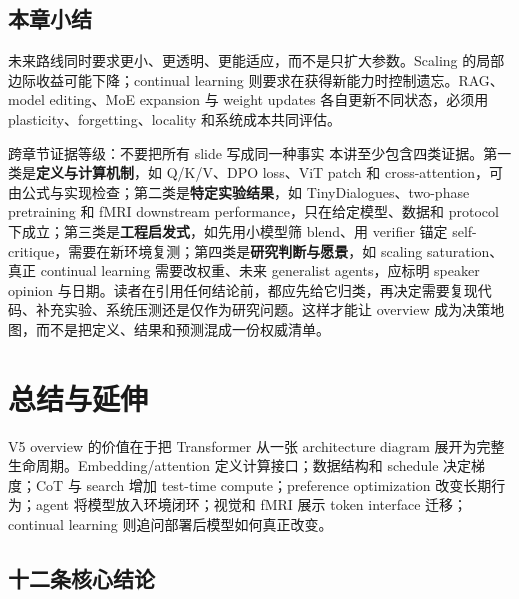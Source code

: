\documentclass[a4paper]{article}
\begin{document}
\subsection{本章小结}

未来路线同时要求更小、更透明、更能适应，而不是只扩大参数。Scaling 的局部边际收益可能下降；continual learning 则要求在获得新能力时控制遗忘。RAG、model editing、MoE expansion 与 weight updates 各自更新不同状态，必须用 plasticity、forgetting、locality 和系统成本共同评估。


\begin{importantbox}{跨章节证据等级：不要把所有 slide 写成同一种事实}
本讲至少包含四类证据。第一类是\textbf{定义与计算机制}，如 Q/K/V、DPO loss、ViT patch 和 cross-attention，可由公式与实现检查；第二类是\textbf{特定实验结果}，如 TinyDialogues、two-phase pretraining 和 fMRI downstream performance，只在给定模型、数据和 protocol 下成立；第三类是\textbf{工程启发式}，如先用小模型筛 blend、用 verifier 锚定 self-critique，需要在新环境复测；第四类是\textbf{研究判断与愿景}，如 scaling saturation、真正 continual learning 需要改权重、未来 generalist agents，应标明 speaker opinion 与日期。读者在引用任何结论前，都应先给它归类，再决定需要复现代码、补充实验、系统压测还是仅作为研究问题。这样才能让 overview 成为决策地图，而不是把定义、结果和预测混成一份权威清单。
\end{importantbox}

\section{总结与延伸}

V5 overview 的价值在于把 Transformer 从一张 architecture diagram 展开为完整生命周期。Embedding/attention 定义计算接口；数据结构和 schedule 决定梯度；CoT 与 search 增加 test-time compute；preference optimization 改变长期行为；agent 将模型放入环境闭环；视觉和 fMRI 展示 token interface 迁移；continual learning 则追问部署后模型如何真正改变。

\subsection{十二条核心结论}
\end{document}
